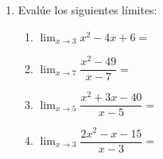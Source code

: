 \documentclass[letterpaper,twoside]{article}
\let\ds\displaystyle
\begin{document}
\begin{enumerate}
   \item Evalúe los siguientes límites:
   \begin{enumerate}
   \item $\ds{\lim_{x\rightarrow 3}x^{2}-4x+6}=$\noanswer
   \item $\ds{\lim_{x\rightarrow 7}\dfrac{x^{2}-49}{x-7}}=$\noanswer
   \item $\ds{\lim_{x\rightarrow 5}\dfrac{x^{2}+3x-40}{x-5}}=$\noanswer
   \item $\ds{\lim_{x\rightarrow 3}\dfrac{2x^{2}-x-15}{x-3}}=$\noanswer
   \end{enumerate}
 \end{enumerate}
\end{document}
